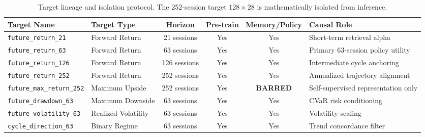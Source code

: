 \begin{table}[ht]
\centering
\small
\begin{tabular}{llcccl}
\toprule
\textbf{Target Name} & \textbf{Target Type} & \textbf{Horizon} & \textbf{Pre-train} & \textbf{Memory/Policy} & \textbf{Causal Role} \\
\midrule
\texttt{future\_return\_21} & Forward Return & 21 sessions & Yes & Yes & Short-term retrieval alpha \\
\texttt{future\_return\_63} & Forward Return & 63 sessions & Yes & Yes & Primary 63-session policy utility \\
\texttt{future\_return\_126} & Forward Return & 126 sessions & Yes & Yes & Intermediate cycle anchoring \\
\texttt{future\_return\_252} & Forward Return & 252 sessions & Yes & Yes & Annualized trajectory alignment \\
\texttt{future\_max\_return\_252} & Maximum Upside & 252 sessions & Yes & \textbf{BARRED} & Self-supervised representation only \\
\texttt{future\_drawdown\_63} & Maximum Downside & 63 sessions & Yes & Yes & CVaR risk conditioning \\
\texttt{future\_volatility\_63} & Realized Volatility & 63 sessions & Yes & Yes & Volatility scaling \\
\texttt{cycle\_direction\_63} & Binary Regime & 63 sessions & Yes & Yes & Trend concordance filter \\
\bottomrule
\end{tabular}
\caption{Target lineage and isolation protocol. The 252-session target $128 \times 28$ is mathematically isolated from inference.}
\label{tab:target_lineage}
\end{table}
